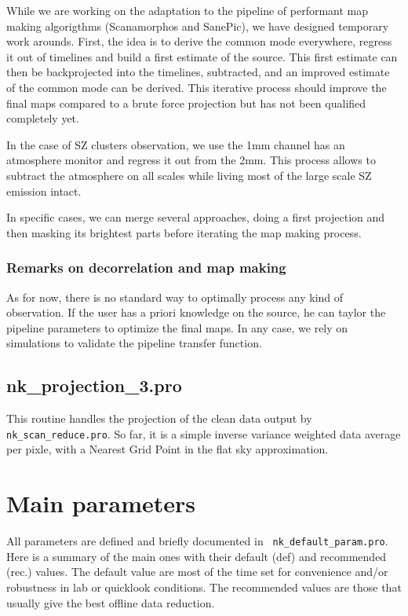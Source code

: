 \documentclass[a4paper,10pt]{article}
\begin{document}
While we are working on the adaptation to the pipeline of performant map making
algorigthms (Scanamorphos and SanePic), we
have designed temporary work arounds. First, the idea is to derive the common
mode everywhere, regress it out of timelines and build a first estimate of the
source. This first estimate can then be backprojected into the timelines,
subtracted, and an improved estimate of the common mode can be derived. This
iterative process should improve the final maps compared to a brute force
projection but has not been qualified completely yet.

In the case of SZ clusters observation, we use the 1mm channel has an atmosphere
monitor and regress it out from the 2mm. This process allows to subtract the
atmosphere on all scales while living most of the large scale SZ emission
intact.

In specific cases, we can merge several approaches, doing a first projection and
then masking its brightest parts before iterating the map making process.


\subsubsection{Remarks on decorrelation and map making}

As for now, there is no standard way to optimally process any kind of
observation. If the user has a priori knowledge on the source, he can taylor the
pipeline parameters to optimize the final maps. In any case, we rely on
simulations to validate the pipeline transfer function.

\subsection{nk\_projection\_3.pro}

This routine handles the projection of the clean data output by {\tt
  nk\_scan\_reduce.pro}. So far, it is a simple inverse variance weighted data
average per pixle, with a Nearest Grid Point in the flat sky approximation.


\section{Main parameters}
\label{se:parameters}

All parameters are defined and briefly documented in {\tt
  nk\_default\_param.pro}. Here is a summary of the main ones with their default
(def) and recommended (rec.) values. The default value are most of the time set for convenience and/or
robustness in lab or quicklook conditions. The recommended values are those that
usually give the best offline data reduction.
\end{document}
